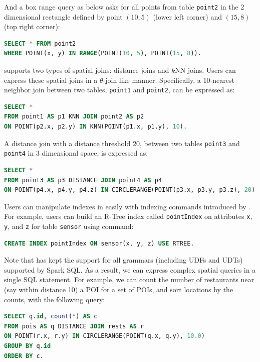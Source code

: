 And a box range query as below asks for all points from table
\texttt{point2} in the 2 dimensional rectangle defined by point
$(10, 5)$ (lower left corner) and $(15, 8)$ (top right corner):
\begin{lstlisting}[language=SQL]
SELECT * FROM point2
WHERE POINT(x, y) IN RANGE(POINT(10, 5), POINT(15, 8)).
\end{lstlisting}\vspace{-1mm}

 \name supports two types of spatial joins:
distance joins and $k$NN joins.  Users can express these spatial joins
in a $\theta$-join like manner. Specifically, a 10-nearest neighbor
join between two tables, \texttt{point1} and \texttt{point2}, can be
expressed as:
\begin{lstlisting}[language=SQL]
SELECT *
FROM point1 AS p1 KNN JOIN point2 AS p2
ON POINT(p2.x, p2.y) IN KNN(POINT(p1.x, p1.y), 10).
\end{lstlisting}\vspace{-2mm}

A distance join with a distance threshold $20$, between two tables
\texttt{point3} and \texttt{point4} in 3 dimensional space, is
expressed as:
\begin{lstlisting}[language=SQL]
SELECT *
FROM point3 AS p3 DISTANCE JOIN point4 AS p4
ON POINT(p4.x, p4.y, p4.z) IN CIRCLERANGE(POINT(p3.x, p3.y, p3.z), 20).
\end{lstlisting}\vspace{-2mm}



 Users can manipulate indexes in \name
easily with indexing commands introduced by \name. For example, users
can build an R-Tree index called \texttt{pointIndex} on attributes
\texttt{x}, \texttt{y}, and \texttt{z} for table \texttt{sensor} using
command:
\begin{lstlisting}[language=SQL]
CREATE INDEX pointIndex ON sensor(x, y, z) USE RTREE.
\end{lstlisting}\vspace{-2mm}

 Note that \name has kept the support for
all grammars (including UDFs and UDTs) supported by Spark SQL. As a
result, we can express complex spatial queries in a single SQL
statement. For example, we can count the number of restaurants near
(say within distance 10) a POI for a set of POIs, and sort
locations by the counts, with the following query:
\begin{lstlisting}[language=SQL]
SELECT q.id, count(*) AS c
FROM pois AS q DISTANCE JOIN rests AS r
ON POINT(r.x, r.y) IN CIRCLERANGE(POINT(q.x, q.y), 10.0)
GROUP BY q.id
ORDER BY c.
\end{lstlisting}\vspace{-2mm}


